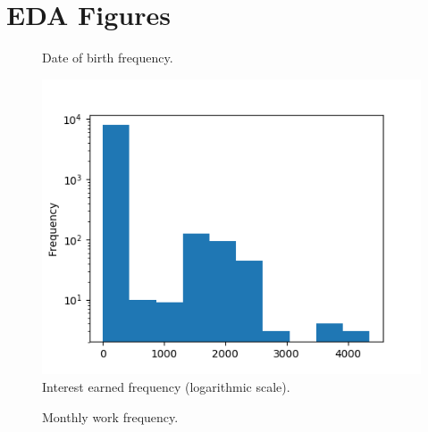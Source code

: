 \section{EDA Figures}

\begin{figure}[!h]
    \caption{Date of birth frequency.}
    \label{fig:birth_date_freq}
    \centering
    
\end{figure}


\begin{figure}[!h]
    \caption{Interest earned frequency (logarithmic scale).}
    \label{fig:interest_earned_freq}
    \centering
%    
    \includegraphics{./img/interest_earned_freq.png}
\end{figure}

\begin{figure}[!h]
    \caption{Monthly work frequency.}
    \label{fig:monthly_work_freq}
    \centering
    
\end{figure}

\begin{figure}[!h]
    \caption{Sections of the cross-correlation matrix.}
    \label{fig:cross-matrix}

    \begin{subfigure}[b]{\linewidth}
        \centering
        \scalebox{0.3}{}
    \end{subfigure}

    \begin{subfigure}[b]{\linewidth}
        \centering
        \scalebox{0.3}{}
    \end{subfigure}
\end{figure}


